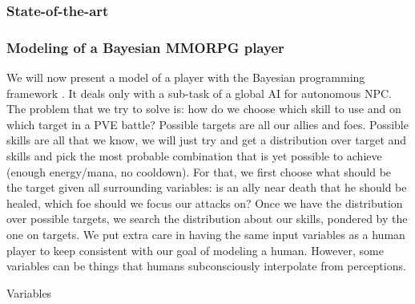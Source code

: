 \subsubsection{State-of-the-art}

\citep{Cutumisu09}

\subsubsection{Modeling of a Bayesian MMORPG player}

We will now present a model of a player with the Bayesian programming framework \citep{SYNNAEVE:MMORPG}. It deals only with a sub-task of a global AI for autonomous NPC. The problem that we try to solve is: how do we choose which skill to use and on which target in a PVE battle? Possible targets are all our allies and foes. Possible skills are all that we know, we will just try and get a distribution over target and skills and pick the most probable combination that is yet possible to achieve (enough energy/mana, no cooldown). For that, we first choose what should be the target given all surrounding variables: is an ally near death that he should be healed, which foe should we focus our attacks on? Once we have the distribution over possible targets, we search the distribution about our skills, pondered by the one on targets. We put extra care in having the same input variables as a human player to keep consistent with our goal of modeling a human. However, some variables can be things that humans subconsciously interpolate from perceptions.

\begin{center}
Variables
\end{center}

